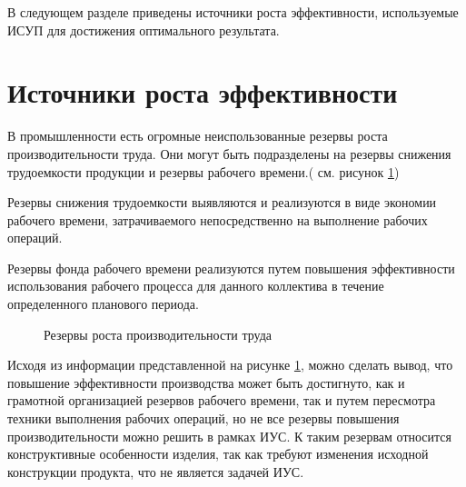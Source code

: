 В следующем разделе приведены источники роста эффективности, используемые ИСУП для достижения оптимального результата. 

\section{Источники роста эффективности}

В промышленности есть огромные неиспользованные резервы роста производительности труда. Они могут быть подразделены на резервы снижения трудоемкости продукции и резервы рабочего времени.( см. рисунок \ref{ris:reserve1})

Резервы снижения трудоемкости выявляются и реализуются в виде экономии рабочего времени, затрачиваемого непосредственно на выполнение рабочих операций.

Резервы фонда рабочего времени реализуются путем повышения эффективности использования рабочего процесса для данного коллектива в течение определенного планового периода\cite{Lenin}. 


\begin{figure}[H]
    \caption{Резервы роста производительности труда}
    \label{ris:reserve1}
\end{figure}

Исходя из информации представленной на рисунке \ref{ris:reserve1}, можно сделать вывод, что повышение эффективности производства может быть достигнуто, как и грамотной организацией резервов рабочего времени, так и путем пересмотра техники выполнения рабочих операций, но не все резервы повышения производительности можно решить в рамках ИУС. К таким резервам относится конструктивные особенности изделия, так как требуют изменения исходной конструкции продукта, что не является задачей ИУС. 

